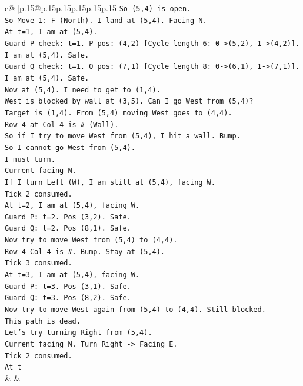 \documentclass{article}
\begin{document}
{\begin{supertabular}{c@{$\;$}|p{.15\linewidth}@{}p{.15\linewidth}p{.15\linewidth}p{.15\linewidth}p{.15\linewidth}p{.15\linewidth}}
{{{\texttt{So (5,4) is open.} \\
\texttt{So Move 1: F (North). I land at (5,4). Facing N.} \\
\texttt{At t=1, I am at (5,4).} \\
\texttt{Guard P check: t=1. P pos: (4,2) {[}Cycle length 6: 0{-}>(5,2), 1{-}>(4,2){]}. I am at (5,4). Safe.} \\
\texttt{Guard Q check: t=1. Q pos: (7,1) {[}Cycle length 8: 0{-}>(6,1), 1{-}>(7,1){]}. I am at (5,4). Safe.} \\
\texttt{Now at (5,4). I need to get to (1,4).} \\
\texttt{West is blocked by wall at (3,5). Can I go West from (5,4)?} \\
\texttt{Target is (1,4). From (5,4) moving West goes to (4,4).} \\
\texttt{Row 4 at Col 4 is \# (Wall).} \\
\texttt{So if I try to move West from (5,4), I hit a wall. Bump.} \\
\texttt{So I cannot go West from (5,4).} \\
\texttt{I must turn.} \\
\texttt{Current facing N.} \\
\texttt{If I turn Left (W), I am still at (5,4), facing W.} \\
\texttt{Tick 2 consumed.} \\
\texttt{At t=2, I am at (5,4), facing W.} \\
\texttt{Guard P: t=2. Pos (3,2). Safe.} \\
\texttt{Guard Q: t=2. Pos (8,1). Safe.} \\
\texttt{Now try to move West from (5,4) to (4,4).} \\
\texttt{Row 4 Col 4 is \#. Bump. Stay at (5,4).} \\
\texttt{Tick 3 consumed.} \\
\texttt{At t=3, I am at (5,4), facing W.} \\
\texttt{Guard P: t=3. Pos (3,1). Safe.} \\
\texttt{Guard Q: t=3. Pos (8,2). Safe.} \\
\texttt{Now try to move West again from (5,4) to (4,4). Still blocked.} \\
\texttt{This path is dead.} \\
\texttt{Let's try turning Right from (5,4).} \\
\texttt{Current facing N. Turn Right {-}> Facing E.} \\
\texttt{Tick 2 consumed.} \\
\texttt{At t} \\
            }
        }
    }
    & & \\ \\


\end{supertabular}}
\end{document}
